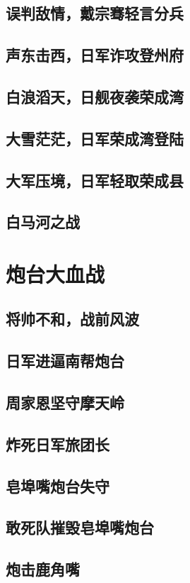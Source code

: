 \documentclass[12pt,UTF8]{ctexbook}
\begin{document}
\chapter{误判敌情，戴宗骞轻言分兵}
\chapter{声东击西，日军诈攻登州府}
\chapter{白浪滔天，日舰夜袭荣成湾}
\chapter{大雪茫茫，日军荣成湾登陆}
\chapter{大军压境，日军轻取荣成县}
\chapter{白马河之战}


\part{炮台大血战}

\chapter{将帅不和，战前风波}
\chapter{日军进逼南帮炮台}
\chapter{周家恩坚守摩天岭}
\chapter{炸死日军旅团长}
\chapter{皂埠嘴炮台失守}
\chapter{敢死队摧毁皂埠嘴炮台}
\chapter{炮击鹿角嘴}
\end{document}
